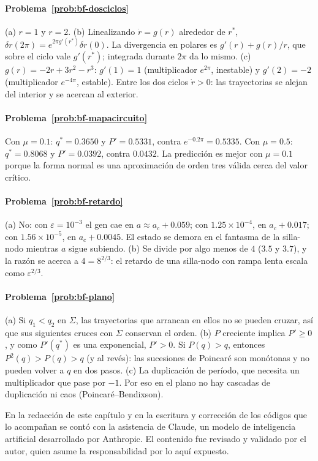 \paragraph{Problema~\ref{prob:bf-dosciclos}}
(a) $r=1$ y $r=2$. (b) Linealizando $\dot r=g(r)$ alrededor de $r^*$, $\delta r(2\pi)=e^{2\pi g'(r^*)}\delta r(0)$. La divergencia en polares es $g'(r)+g(r)/r$, que sobre el ciclo vale $g'(r^*)$; integrada durante $2\pi$ da lo mismo. (c) $g(r)=-2r+3r^2-r^3$: $g'(1)=1$ (multiplicador $e^{2\pi}$, inestable) y $g'(2)=-2$ (multiplicador $e^{-4\pi}$, estable). Entre los dos ciclos $\dot r>0$: las trayectorias se alejan del interior y se acercan al exterior.

\paragraph{Problema~\ref{prob:bf-mapacircuito}}
Con $\mu=0.1$: $q^*=0.3650$ y $P'=0.5331$, contra $e^{-0.2\pi}=0.5335$. Con $\mu=0.5$: $q^*=0.8068$ y $P'=0.0392$, contra $0.0432$. La predicción es mejor con $\mu=0.1$ porque la forma normal es una aproximación de orden tres válida cerca del valor crítico.

\paragraph{Problema~\ref{prob:bf-retardo}}
(a) No: con $\varepsilon=10^{-3}$ el gen cae en $a\approx a_c+0.059$; con $1.25\times10^{-4}$, en $a_c+0.017$; con $1.56\times10^{-5}$, en $a_c+0.0045$. El estado se demora en el fantasma de la silla-nodo mientras $a$ sigue subiendo. (b) Se divide por algo menos de $4$ ($3.5$ y $3.7$), y la razón se acerca a $4=8^{2/3}$: el retardo de una silla-nodo con rampa lenta escala como $\varepsilon^{2/3}$.

\paragraph{Problema~\ref{prob:bf-plano}}
(a) Si $q_1<q_2$ en $\Sigma$, las trayectorias que arrancan en ellos no se pueden cruzar, así que sus siguientes cruces con $\Sigma$ conservan el orden. (b) $P$ creciente implica $P'\ge0$, y como $P'(q^*)$ es una exponencial, $P'>0$. Si $P(q)>q$, entonces $P^2(q)>P(q)>q$ (y al revés): las sucesiones de Poincaré son monótonas y no pueden volver a $q$ en dos pasos. (c) La duplicación de período, que necesita un multiplicador que pase por $-1$. Por eso en el plano no hay cascadas de duplicación ni caos (Poincaré--Bendixson).

\respuestaspausas

\begin{parallevar}
En la redacción de este capítulo y en la escritura y corrección de los códigos que lo acompañan se contó con la asistencia de Claude, un modelo de inteligencia artificial desarrollado por Anthropic. El contenido fue revisado y validado por el autor, quien asume la responsabilidad por lo aquí expuesto.
\end{parallevar}
